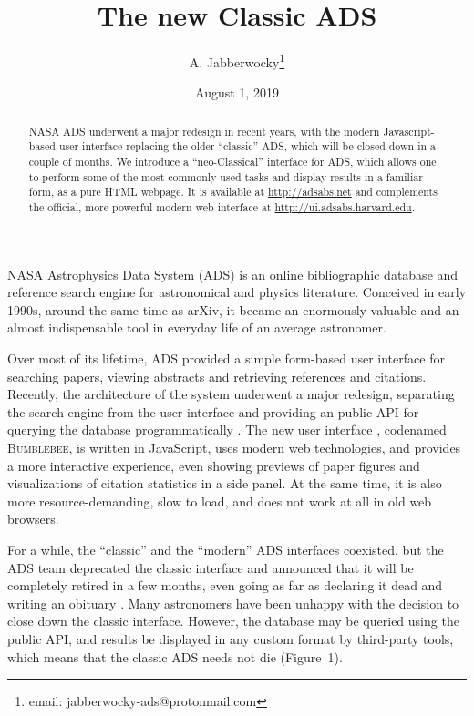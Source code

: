 \documentclass[12pt]{article}
\title{\vspace*{-1.5cm}
The new Classic ADS}
\author{A. Jabberwocky\footnote{email: jabberwocky-ads@protonmail.com}}
\date{August 1, 2019}
\begin{document}
\maketitle
\thispagestyle{empty}

\begin{abstract}
NASA ADS  underwent a major redesign in recent years, with the modern Javascript-based user interface replacing the older ``classic'' ADS, which will be closed down in a couple of months.
We introduce a ``neo-Classical'' interface for ADS, which allows one to perform some of the most commonly used tasks and display results in a familiar form, as a pure HTML webpage. It is available at \url{http://adsabs.net} and complements the official, more powerful modern web interface at \url{http://ui.adsabs.harvard.edu}.
\end{abstract}

NASA Astrophysics Data System (ADS) \cite{ADS} is an online bibliographic database and reference search engine for astronomical and physics literature. Conceived in early 1990s, around the same time as arXiv, it became an enormously valuable and an almost indispensable tool in everyday life of an average astronomer.

Over most of its lifetime, ADS provided a simple form-based user interface for searching papers, viewing abstracts and retrieving references and citations. Recently, the architecture of the system underwent a major redesign, separating the search engine from the user interface and providing an public API for querying the database programmatically \cite{ADS2}. The new user interface \cite{ADSnew}, codenamed \textsc{Bumblebee}, is written in JavaScript, uses modern web technologies, and provides a more interactive experience, even showing previews of paper figures and visualizations of citation statistics in a side panel. At the same time, it is also more resource-demanding, slow to load, and does not work at all in old web browsers. 

For a while, the ``classic'' and the ``modern'' ADS interfaces coexisted, but the ADS team deprecated the classic interface and announced that it will be completely retired in a few months, even going as far as declaring it dead and writing an obituary \cite{Obituary}. Many astronomers have been unhappy with the decision to close down the classic interface. However, the database may be queried using the public API, and results be displayed in any custom format by third-party tools, which means that the classic ADS needs not die (Figure~1).
\end{document}
